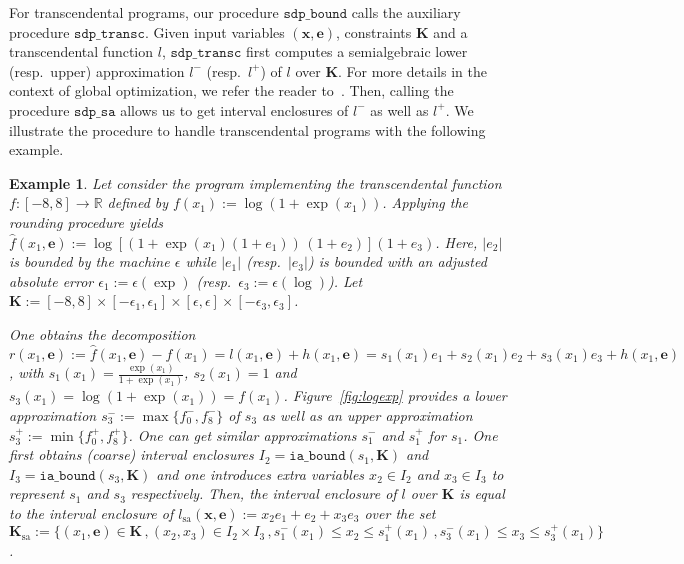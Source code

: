 \documentclass[preprint]{sigplanconf}
\newcommand{\R}{\mathbb{R}}
\newcommand{\x}{\mathbf{x}}
\newcommand{\e}{\mathbf{e}}
\def\K{\mathbf{K}}
\newcommand{\iaboundfun}[2]{\mathtt{ia\_bound}(#1, #2)}
\newcommand{\sdpbound}{\mathtt{sdp\_bound}}
\newcommand{\sa}{_\text{sa}}
\newcommand{\sdpsa}{\mathtt{sdp\_sa}}
\newcommand{\sdptransc}{\mathtt{sdp\_transc}}
\theoremstyle{plain}
\newtheorem{example}{Example}
\begin{document}
For transcendental programs, our procedure $\sdpbound$ calls the auxiliary procedure $\sdptransc$. Given input variables $(\x,\e)$, constraints $\K$ and a transcendental function $l$, $\sdptransc$ first computes a semialgebraic lower (resp.~upper)  approximation $l^-$ (resp.~$l^+$) of $l$ over $\K$. For more details in the context of global optimization, we refer the reader to~\cite{Magron15sdp}. Then, calling the procedure $\sdpsa$ allows us to get interval enclosures of $l^-$ as well as $l^+$.
We illustrate the procedure to handle transcendental programs with the following example.
\begin{example}
\label{ex:logexp}
Let consider the program implementing the transcendental function $f : [-8, 8] \to \R$ defined by $f(x_1) := \log (1 + \exp(x_1))$. Applying the rounding procedure  yields $\hat{f}(x_1,\e) := \log [(1 + \exp(x_1) (1 + e_1)) \, (1 + e_2)](1 + e_3)$. 
Here, $|e_2|$ is bounded by the machine $\epsilon$ while $|e_1|$ (resp.~$|e_3|$) is bounded with an adjusted absolute error $\epsilon_1 := \epsilon(\exp)$ (resp.~$\epsilon_3 := \epsilon(\log)$).
Let $\K:= [-8,8] \times [-\epsilon_1, \epsilon_1] \times [\epsilon, \epsilon] \times [-\epsilon_3, \epsilon_3]$.

One obtains the decomposition $r(x_1, \e) := \hat{f}(x_1,\e) - f(x_1) = l(x_1,\e) + h(x_1,\e) = s_1 (x_1) e_1 + s_2 (x_1) e_2 + s_3 (x_1) e_3 + h(x_1, \e)$, with 
$s_1(x_1) = \frac{\exp(x_1)} {1 + \exp(x_1)}$, $s_2(x_1) = 1$ and $s_3(x_1) = \log (1 + \exp(x_1)) = f(x_1)$. Figure~\ref{fig:logexp} provides a lower approximation $s_3^- := \max\{f_0^-,f_8^-\}$ of $s_3$ as well as an upper approximation $s_3^+ := \min \{f_0^+,f_8^+\}$. One can get similar approximations $s_1^-$ and $s_1^+$ for $s_1$. 
%
One first obtains (coarse) interval enclosures $I_2 = \iaboundfun{s_1}{\K}$ and $I_3 = \iaboundfun{s_3}{\K}$ and one introduces extra variables $x_2 \in I_2$ and $x_3 \in I_3$ to represent $s_1$ and $s_3$ respectively.
Then, the interval enclosure of $l$ over $\K$ is equal to the interval enclosure of $l\sa(\x,\e) := x_2 e_1 + e_2 + x_3 e_3$ over the set $\K\sa:= \{(x_1,\e) \in \K \,, (x_2, x_3) \in I_2 \times I_3 \,, s_1^-(x_1) \leq x_2 \leq s_1^+(x_1) \,, s_3^-(x_1) \leq x_3 \leq s_3^+(x_1) \}$.
\end{example}
%
\end{document}
